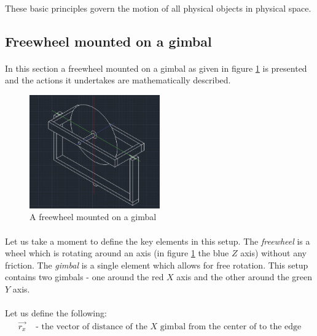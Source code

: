 \documentclass[a4paper]{article}
\begin{document}
\paragraph*{}
These basic principles govern the motion of all physical objects in physical
space.

\subsection{Freewheel mounted on a gimbal}

\paragraph*{}
In this section a freewheel mounted on a gimbal as given in figure
\ref{fig:gimbal-fw} is presented and the actions it undertakes are
mathematically described.

\begin{figure}[ht]
  \centering
  \includegraphics[width=0.5\textwidth]{img/gimbal-fw}
  \caption{A freewheel mounted on a gimbal}
  \label{fig:gimbal-fw}
\end{figure}

\paragraph*{}
Let us take a moment to define the key elements in this setup. The
\textit{freewheel} is a wheel which is rotating around an axis (in figure
\ref{fig:gimbal-fw} the blue $Z$ axis) without any friction. The
\textit{gimbal} is a single element which allows for free rotation. This setup
contains two gimbals - one around the red $X$ axis and the other around the
green $Y$ axis.

\paragraph*{}
Let us define the following:
\begin{align*}
  \vec{r_x} & \text{ - the vector of distance of the $X$ gimbal from the center
  of to the edge}
\end{align*}
\end{document}
